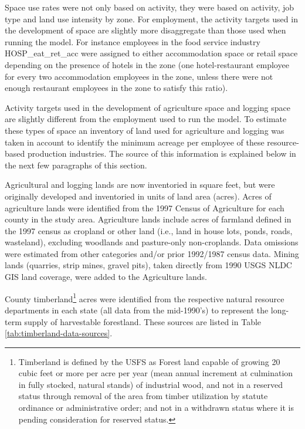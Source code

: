 
Space use rates were not only based on activity, they were based on activity, job type and land use intensity by zone.  For employment, the activity targets used in the development of space are slightly more disaggregate than those used when running the model. For instance employees in the food service industry HOSP\_eat\_ret\_acc were assigned to either accommodation space or retail space depending on the presence of hotels in the zone (one hotel-restaurant employee for every two accommodation employees in the zone, unless there were not enough restaurant employees in the zone to satisfy this ratio). 

Activity targets used in the development of agriculture space and logging space are slightly different from the employment used to run the model. To estimate these types of space an inventory of land used for agriculture and logging was taken in account to identify the minimum acreage per employee of these resource-based production industries. The source of this information is explained below in the next few paragraphs of this section.  

Agricultural and logging lands are now inventoried in square feet, but were originally developed and inventoried in units of land area (acres). Acres of agriculture lands were identified from the 1997 Census of Agriculture for each county in the study area. Agriculture lands include acres of farmland defined in the 1997 census as cropland or other land (i.e., land in house lots, ponds, roads, wasteland), excluding woodlands and pasture-only non-croplands. Data omissions were estimated from other categories and/or prior 1992/1987 census data. Mining lands (quarries, strip mines, gravel pits), taken directly from 1990 USGS NLDC GIS land coverage, were added to the Agriculture lands.

County timberland\footnote{Timberland is defined by the USFS as Forest land capable of growing 20 cubic feet or more per acre per year (mean annual increment at culmination in fully stocked, natural stands) of industrial wood, and not in a reserved status through removal of the area from timber utilization by statute ordinance or administrative order; and not in a withdrawn status where it is pending consideration for reserved status.} acres were identified from the respective natural resource departments in each state (all data from the mid-1990's) to represent the long-term supply of harvestable forestland. These sources are listed in Table \ref{tab:timberland-data-sources}.


